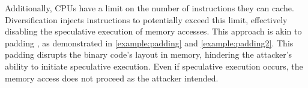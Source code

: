 


 Additionally, CPUs have a limit on the number of instructions they can cache. 
Diversification injects instructions to potentially exceed this limit, effectively disabling the speculative execution of memory accesses. 
This approach is akin to padding \cite{padding}, as demonstrated in \autoref{example:padding} and \autoref{example:padding2}.
This padding disrupts the binary code's layout in memory, hindering the attacker's ability to initiate speculative execution. 
Even if speculative execution occurs, the memory access does not proceed as the attacker intended.





